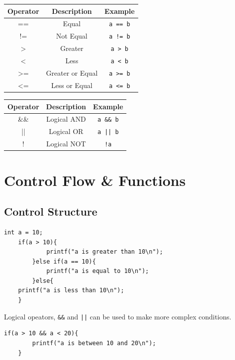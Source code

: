 \documentclass[a4paper, 10pt]{article}
\begin{document}
\vspace{1em}
\begin{minipage}{0.50\textwidth}
    \centering
    \begin{tabular}{|c|c|c|}
        \hline
        Operator & Description      & Example         \\
        \hline
        ==       & Equal            & \texttt{a == b} \\
        \hline
        !=       & Not Equal        & \texttt{a != b} \\
        \hline
        >        & Greater          & \texttt{a > b}  \\
        \hline
        <        & Less             & \texttt{a < b}  \\
        \hline
        >=       & Greater or Equal & \texttt{a >= b} \\
        \hline
        <=       & Less or Equal    & \texttt{a <= b} \\
        \hline
    \end{tabular}
\end{minipage}
\hfill
\begin{minipage}{0.45\textwidth}
    \centering
    \begin{tabular}{|c|c|c|}
        \hline
        Operator & Description & Example           \\
        \hline
        \&\&     & Logical AND & \texttt{a \&\& b} \\
        \hline
        ||       & Logical OR  & \texttt{a || b}   \\
        \hline
        !        & Logical NOT & \texttt{!a}       \\
        \hline
    \end{tabular}
\end{minipage}
\section{Control Flow \& Functions}
\subsection{Control Structure}
\begin{lstlisting}[style=cStyle, caption={If-Else}]
    int a = 10;
    if(a > 10){
            printf("a is greater than 10\n");
        }else if(a == 10){
            printf("a is equal to 10\n");
        }else{
    printf("a is less than 10\n");
    }
    \end{lstlisting}
Logical opeators, \texttt{\&\&} and \texttt{||} can be used to make more complex conditions.
\begin{lstlisting}[style=cStyle, caption={Complex If-Else}]
    if(a > 10 && a < 20){
        printf("a is between 10 and 20\n");
    }
    \end{lstlisting}
\end{document}
